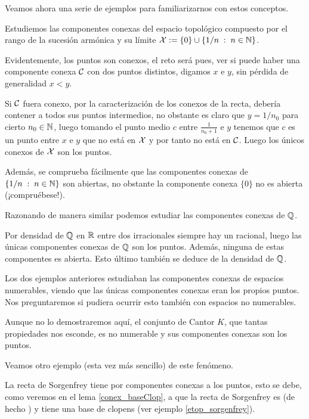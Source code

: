 Veamos ahora una serie de ejemplos para familiarizarnos con estos conceptos.
\begin{exa}
	Estudiemos las componentes conexas del espacio topológico compuesto por el rango de la sucesión armónica y su límite $\mathcal{X}:=\{0\}\cup\{1/n\;:\; n\in\mathbb{N}\}$.
	
	Evidentemente, los puntos son conexos, el reto será pues, ver si puede haber una componente conexa $\mathcal{C}$ con dos puntos distintos, digamos $x$ e $y$, sin pérdida de generalidad $x<y$.
	
	Si $\mathcal{C}$ fuera conexo, por la caracterización de los conexos de la recta, debería contener a todos sus puntos intermedios, no obstante es claro que $y=1/n_0$ para cierto $n_0\in\mathbb{N}$, luego tomando el punto medio $c$ entre $\frac{1}{n_0+1}$ e $y$ tenemos que $c$ es un punto entre $x$ e $y$ que no está en $\mathcal{X}$ y por tanto no está en $\mathcal{C}$. Luego los únicos conexos de $\mathcal{X}$ son los puntos.
	
	Además, se comprueba fácilmente que las componentes conexas de $\{1/n\;:\; n\in\mathbb{N}\}$ son abiertas, no obstante la componente conexa $\{0\}$ no es abierta (¡compruébese!).
\end{exa}
Razonando de manera similar podemos estudiar las componentes conexas de $\mathbb{Q}$.
\begin{exa}[Racionales] Por densidad de $\mathbb{Q}$ en $\mathbb{R}$ entre dos irracionales siempre hay un racional, luego las únicas componentes conexas de $\mathbb{Q}$ son los puntos. Además, ninguna de estas componentes es abierta. Esto último también se deduce de la densidad de $\mathbb{Q}$.
\end{exa}
Los dos ejemplos anteriores estudiaban las componentes conexas de espacios numerables, viendo que las únicas componentes conexas eran los propios puntos. Nos preguntaremos si pudiera ocurrir esto también con espacios no numerables.
\begin{exa}
	Aunque no lo demostraremos aquí, el conjunto de Cantor $K$, que tantas propiedades nos esconde, es no numerable y sus componentes conexas son los puntos. 
\end{exa}
Veamos otro ejemplo (esta vez más sencillo) de este fenómeno.
\begin{exa}[Sorgenfrey]
	La recta de Sorgenfrey tiene por componentes conexas a los puntos, esto se debe, como veremos en el lema \ref{conex_baseClop}, a que la recta de Sorgenfrey es \kolmogorov (de hecho \hausdorff) y tiene una base de clopens (ver ejemplo \ref{etop_sorgenfrey}).  
\end{exa}
